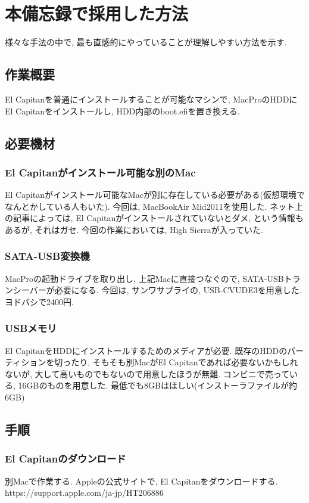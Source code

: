 \documentclass{jsarticle}
\begin{document}
\section{本備忘録で採用した方法}
様々な手法の中で, 最も直感的にやっていることが理解しやすい方法を示す. 

\subsection{作業概要}
El Capitanを普通にインストールすることが可能なマシンで, MacProのHDDにEl Capitanをインストールし, HDD内部のboot.efiを置き換える. 

\subsection{必要機材}
\subsubsection{El Capitanがインストール可能な別のMac}
El Capitanがインストール可能なMacが別に存在している必要がある(仮想環境でなんとかしている人もいた). 
今回は, MacBookAir Mid2011を使用した. 
ネット上の記事によっては, El Capitanがインストールされていないとダメ, という情報もあるが, それはガセ. 
今回の作業においては, High Sierraが入っていた. 

\subsubsection{SATA-USB変換機}
MacProの起動ドライブを取り出し, 上記Macに直接つなぐので, SATA-USBトランシーバーが必要になる. 
今回は, サンワサプライの, USB-CVUDE3を用意した. ヨドバシで2400円. 

\subsubsection{USBメモリ}
El CapitanをHDDにインストールするためのメディアが必要. 
既存のHDDのパーティションを切ったり, そもそも別MacがEl Capitanであれば必要ないかもしれないが, 大して高いものでもないので用意したほうが無難. 
コンビニで売っている, 16GBのものを用意した. 
最低でも8GBはほしい(インストーラファイルが約6GB)

\subsection{手順}
\subsubsection{El Capitanのダウンロード}\label{sequence_download}
別Macで作業する. 
Appleの公式サイトで, El Capitanをダウンロードする. 
https://support.apple.com/ja-jp/HT206886
\end{document}
